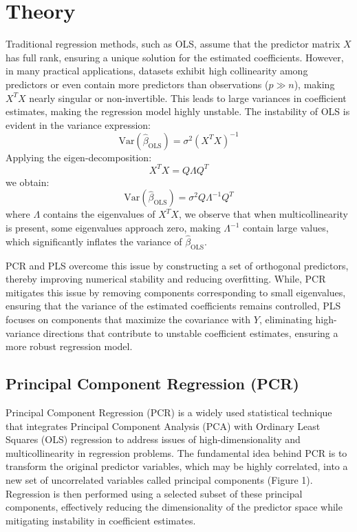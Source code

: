 \documentclass[11pt,twoside,a4paper]{article}
\begin{document}
\section{Theory}

Traditional regression methods, such as OLS, assume that the predictor matrix \( X \) has full rank, ensuring a unique solution for the estimated coefficients. However, in many practical applications, datasets exhibit high collinearity among predictors or even contain more predictors than observations (\( p \gg n \)), making \( X^T X \) nearly singular or non-invertible. This leads to large variances in coefficient estimates, making the regression model highly unstable. The instability of OLS is evident in the variance expression:
\begin{equation} 
\text{Var}(\hat{\beta}_{\text{OLS}}) = \sigma^2 (X^T X)^{-1}
\end{equation}
Applying the eigen-decomposition:
\begin{equation}
X^T X = Q \Lambda Q^T
\end{equation}
we obtain:
\begin{equation}
\text{Var}(\hat{\beta}_{\text{OLS}}) = \sigma^2 Q \Lambda^{-1} Q^T
\end{equation}
where \( \Lambda \) contains the eigenvalues of \( X^T X \), we observe that when multicollinearity is present, some eigenvalues approach zero, making \( \Lambda^{-1} \) contain large values, which significantly inflates the variance of \( \hat{\beta}_{\text{OLS}} \).

PCR and PLS overcome this issue by constructing a set of orthogonal predictors, thereby improving numerical stability and reducing overfitting. While,  PCR mitigates this issue by removing components corresponding to small eigenvalues, ensuring that the variance of the estimated coefficients remains controlled, PLS focuses on components that maximize the covariance with \( Y \), eliminating high-variance directions that contribute to unstable coefficient estimates, ensuring a more robust regression model.


\subsection{Principal Component Regression (PCR)}

Principal Component Regression (PCR) is a widely used statistical technique that integrates Principal Component Analysis (PCA) with Ordinary Least Squares (OLS) regression to address issues of high-dimensionality and multicollinearity in regression problems. The fundamental idea behind PCR is to transform the original predictor variables, which may be highly correlated, into a new set of uncorrelated variables called principal components (Figure 1). Regression is then performed using a selected subset of these principal components, effectively reducing the dimensionality of the predictor space while mitigating instability in coefficient estimates.
\end{document}

